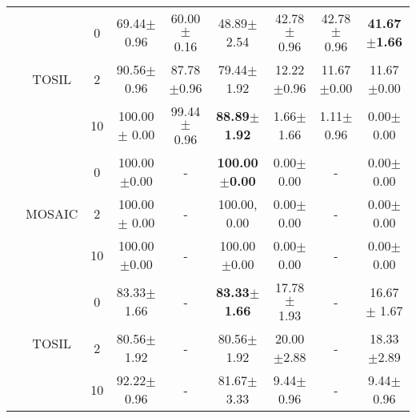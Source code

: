 \begin{table}[t]
{\begin{tabular}{|c|c|c|c|c|c|c|c|c|}
    \cline{2-9}
     & \multirow{3}{*}{TOSIL} & 0 & 69.44$\pm$
      0.96 & 60.00$\pm$
      0.16 & 48.89$\pm$
      2.54 & 42.78$\pm$
      0.96 & 42.78$\pm$
      0.96 & \textbf{41.67$\pm$1.66} \\ 
    \cline{3-9}
     & & 2 & 90.56$\pm$0.96 & 87.78$\pm$0.96 & 79.44$\pm$1.92 & 12.22$\pm$0.96 & 11.67$\pm$0.00 & 11.67$\pm$0.00 \\ 
    \cline{3-9}
     &  & 10 & 100.00$\pm$
      0.00 & 99.44$\pm$
      0.96 & \textbf{88.89$\pm$1.92} & 1.66$\pm$
      1.66 & 1.11$\pm$
      0.96 & 0.00$\pm$
      0.00 \\ 
    \hhline{|=========|}
    \multirow{6}{*}{\rotatebox[origin=c]{90}{Press-Button}} & \multirow{3}{*}{MOSAIC} & 0 & 100.00$\pm$0.00 & - & \textbf{100.00$\pm$0.00} & 0.00$\pm$0.00 & - & 0.00$\pm$0.00 \\ 
    \cline{3-9}
     & & 2 & 100.00$\pm$
      0.00 & - & 100.00,
      0.00 & 0.00$\pm$
      0.00 & - & 0.00$\pm$
      0.00 \\ 
    \cline{3-9}
     &  & 10 & 100.00$\pm$0.00 & - & 100.00$\pm$0.00 & 0.00$\pm$0.00 & - & 0.00$\pm$0.00 \\ 
    \cline{2-9}
     & \multirow{3}{*}{TOSIL} & 0 & 83.33$\pm$
      1.66 & - & \textbf{83.33$\pm$1.66} & 17.78$\pm$
      1.93 & - & 16.67$\pm$
      1.67 \\ 
    \cline{3-9}
     & & 2 & 80.56$\pm$1.92 & - & 80.56$\pm$1.92 & 20.00$\pm$2.88 & - & 18.33$\pm$2.89 \\ 
    \cline{3-9}
     &  & 10 & 92.22$\pm$
      0.96 & - & 81.67$\pm$
      3.33 & 9.44$\pm$
      0.96 & - & 9.44$\pm$
      0.96 \\
    \hline
    \end{tabular}
    }
    \end{table}